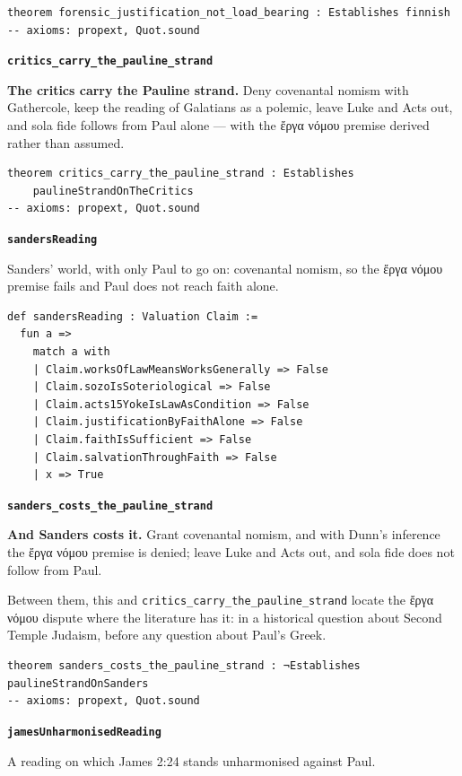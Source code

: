 \documentclass[11pt]{article}
\begin{document}
{\small\begin{verbatim}
theorem forensic_justification_not_load_bearing : Establishes finnish
-- axioms: propext, Quot.sound
\end{verbatim}}
\par\medskip\noindent\textbf{\texttt{critics\_\allowbreak{}carry\_\allowbreak{}the\_\allowbreak{}pauline\_\allowbreak{}strand}}\par\nobreak\noindent
\textbf{The critics carry the Pauline strand.} Deny covenantal nomism with Gathercole, keep the reading of Galatians as a polemic, leave Luke and Acts out, and sola fide follows from Paul alone — with the ἔργα νόμου premise derived rather than assumed.

{\small\begin{verbatim}
theorem critics_carry_the_pauline_strand : Establishes
    paulineStrandOnTheCritics
-- axioms: propext, Quot.sound
\end{verbatim}}
\par\medskip\noindent\textbf{\texttt{sanders\allowbreak{}Reading}}\par\nobreak\noindent
Sanders' world, with only Paul to go on: covenantal nomism, so the ἔργα νόμου premise fails and Paul does not reach faith alone.

{\small\begin{verbatim}
def sandersReading : Valuation Claim :=
  fun a =>
    match a with
    | Claim.worksOfLawMeansWorksGenerally => False
    | Claim.sozoIsSoteriological => False
    | Claim.acts15YokeIsLawAsCondition => False
    | Claim.justificationByFaithAlone => False
    | Claim.faithIsSufficient => False
    | Claim.salvationThroughFaith => False
    | x => True
\end{verbatim}}
\par\medskip\noindent\textbf{\texttt{sanders\_\allowbreak{}costs\_\allowbreak{}the\_\allowbreak{}pauline\_\allowbreak{}strand}}\par\nobreak\noindent
\textbf{And Sanders costs it.} Grant covenantal nomism, and with Dunn's inference the ἔργα νόμου premise is denied; leave Luke and Acts out, and sola fide does not follow from Paul.

Between them, this and \texttt{critics\_\allowbreak{}carry\_\allowbreak{}the\_\allowbreak{}pauline\_\allowbreak{}strand} locate the ἔργα νόμου dispute where the literature has it: in a historical question about Second Temple Judaism, before any question about Paul's Greek.

{\small\begin{verbatim}
theorem sanders_costs_the_pauline_strand : ¬Establishes paulineStrandOnSanders
-- axioms: propext, Quot.sound
\end{verbatim}}
\par\medskip\noindent\textbf{\texttt{james\allowbreak{}Unharmonised\allowbreak{}Reading}}\par\nobreak\noindent
A reading on which James 2:24 stands unharmonised against Paul.
\end{document}
